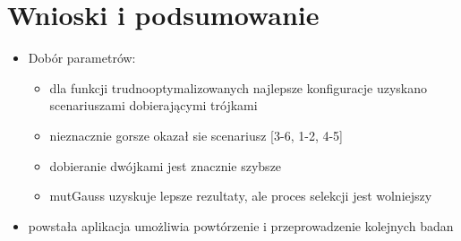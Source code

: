 \newpage
\chapter{Wnioski i podsumowanie}
\begin{itemize}
%
\item Dobór parametrów:
\begin{itemize}
\item dla funkcji trudnooptymalizowanych najlepsze konfiguracje uzyskano scenariuszami dobierającymi trójkami
\item nieznacznie gorsze okazał sie scenariusz [3-6, 1-2, 4-5]
\item dobieranie dwójkami jest znacznie szybsze
\item mutGauss uzyskuje lepsze rezultaty, ale proces selekcji jest wolniejszy
\end{itemize}
\item powstała aplikacja umożliwia powtórzenie i przeprowadzenie kolejnych badan
\end{itemize}

